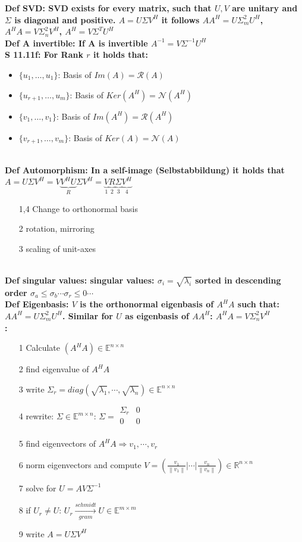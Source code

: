 \documentclass[7pt,landscape, margin = 0.1mm]{article}
\newcommand{\KRZ}[2]{\vspace{1mm} \hline \vspace{1mm} \color{chaptercolor}{RC #1}:\color{black} \   \hspace{0.2cm}\vspace{1mm}   {\begin{minipage}{20em}
#2 \end{minipage}} \vspace{1mm}  \hline \vspace{1mm}  \\}
\newcommand{\DEF}[2]{\color{chaptercolor}\bf{Def #1}:\color{black}    \hspace{0.2cm} #2 \\}
\newcommand{\SA}[2]{\color{chaptercolor}\bf{S #1}:\color{black}    \hspace{0.2cm} #2 \\}
\begin{document}
\begin{multicols}{4}
\begin{flushleft}
\DEF{SVD}{SVD exists for every matrix, such that $U,V$ are unitary and $\Sigma $ is diagonal and positive. $A = U \Sigma V^H $ it follows $AA^H =U\Sigma_{m}^2 U^H $,$A^H A=V \Sigma_{n}^2 V^H $, $A^H = V \Sigma^T U^H $}
\DEF{A invertible}{If A is invertible $A^{-1} = V \Sigma^{-1}U^H $}
\SA{11.11f}{For Rank $r$ it holds that: \begin{itemize}
\item $\{ u_1, \dots, u_1 \}$: Basis of $Im(A) = \mathcal{R}(A) $ 
\item $\{ u_{r+1}, \dots, u_m \}$: Basis of $Ker(A^H) = \mathcal{N}(A^H) $  
\item $\{ v_1, \dots, v_1 \}$: Basis of $Im(A^H) = \mathcal{R}(A^H) $ 
\item $\{ v_{r+1}, \dots, v_m \}$: Basis of $Ker(A) = \mathcal{N}(A) $  
\end{itemize}}
\DEF{Automorphism}{In a self-image (Selbstabbildung) it holds that $A = U \Sigma V^H = V \underbrace{V^HU}_{R}\Sigma V^H= \underbrace{V}_{1}\underbrace{R}_{2}\underbrace{\Sigma}_{3}\underbrace{V^H}_{4} $ \begin{itemize}
\item[1,4]  Change to orthonormal basis
\item[2] rotation, mirroring
\item[3] scaling of unit-axes
\end{itemize}}
\DEF{singular values}{singular values: $\sigma_i = \sqrt{\lambda_i} $ sorted in descending order $\sigma_a \leq \sigma_b \cdots \sigma_r \leq 0 \cdots  $ }
\DEF{Eigenbasis}{$V $ is the orthonormal eigenbasis of $A^HA $ such that: $AA^H =U\Sigma_{m}^2 U^H $. Similar for $U $ as eigenbasis of $AA^H $: $A^H A=V \Sigma_{n}^2 V^H $} 
\KRZ{SVD of $A \in \mathbb{E}^{m \times n}$with $A^HA $}{\begin{itemize}
\item[1] Calculate $(A^HA)\in \mathbb{E}^{n \times n}$
\item[2] find eigenvalue of $A^HA$
 \item[3] write $\Sigma_r = diag(\sqrt{\lambda_{1}}, \cdots, \sqrt{\lambda_{n}}) \in \mathbb{E}^{n \times n}$
\item[4] rewrite: $\Sigma \in \mathbb{E}^{m \times n} $: $\Sigma = \begin{smallmatrix}
 \Sigma_r&  0\\
 0& 0 \\
\end{smallmatrix}$
\item[5] find eigenvectors of $A^HA \Rightarrow v_1 ,\cdots ,v_r$
\item[6] norm eigenvectors and compute $V = ( \frac{v_1}{\left\| v_1 \right\|}|\cdots| \frac{v_n}{\left\| v_n \right\|}) \in \mathbb{R}^{n \times n} $
\item[7] solve for $U = AV\Sigma^{-1} $
\item[8] if $U_r \neq U$: $U_r \xrightarrow[gram]{schmidt} U \in \mathbb{E}^{m \times m} $
\item[9] write $A = U \Sigma V^H $
\end{itemize}}



\end{flushleft}
\end{multicols}
\end{document}
